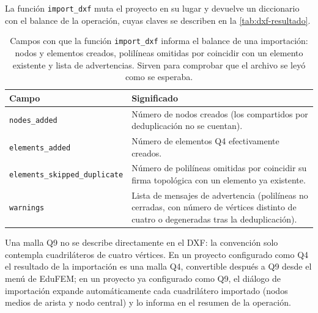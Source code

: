 La función \texttt{import\_dxf} muta el proyecto en su lugar y devuelve un diccionario con el balance de la operación, cuyas claves se describen en la \autoref{tab:dxf-resultado}.

\begin{table}[htbp]
\centering
\caption[Campos del diccionario de resultado de \texttt{import\_dxf}.]{Campos con que la función \texttt{import\_dxf} informa el balance de una importación: nodos y elementos creados, polilíneas omitidas por coincidir con un elemento existente y lista de advertencias. Sirven para comprobar que el archivo se leyó como se esperaba.}
\label{tab:dxf-resultado}
\begin{tabular}{l p{8.4cm}}
\toprule
\textbf{Campo} & \textbf{Significado} \\
\midrule
\texttt{nodes\_added}                & Número de nodos creados (los compartidos por deduplicación no se cuentan). \\
\texttt{elements\_added}             & Número de elementos Q4 efectivamente creados. \\
\texttt{elements\_skipped\_duplicate} & Número de polilíneas omitidas por coincidir su firma topológica con un elemento ya existente. \\
\texttt{warnings}                    & Lista de mensajes de advertencia (polilíneas no cerradas, con número de vértices distinto de cuatro o degeneradas tras la deduplicación). \\
\bottomrule
\end{tabular}
\end{table}

Una malla Q9 no se describe directamente en el DXF: la convención solo contempla cuadriláteros de cuatro vértices. En un proyecto configurado como Q4 el resultado de la importación es una malla Q4, convertible después a Q9 desde el menú de EduFEM; en un proyecto ya configurado como Q9, el diálogo de importación expande automáticamente cada cuadrilátero importado (nodos medios de arista y nodo central) y lo informa en el resumen de la operación.



